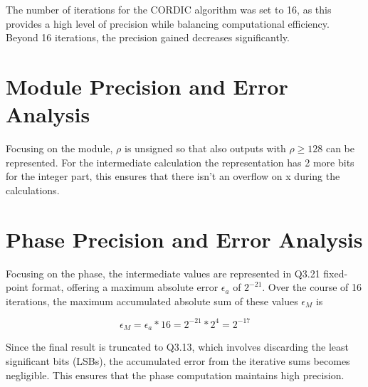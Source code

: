 The number of iterations for the CORDIC algorithm was set to 16, as this provides a high level of precision while balancing computational efficiency. Beyond 16 iterations, the precision gained decreases significantly.

\section{Module Precision and Error Analysis}
Focusing on the module, \( \rho \) is unsigned so that also outputs with \( \rho \geq 128 \) can be represented. For the intermediate calculation the representation has 2 more bits for the integer part, this ensures that there isn't an overflow on x during the calculations.


\section{Phase Precision and Error Analysis}
Focusing on the phase, the intermediate values are represented in Q3.21 fixed-point format, offering a maximum absolute error \( \epsilon_a \) of \(2^{-21}\). Over the course of 16 iterations, the maximum accumulated absolute sum of these values \( \epsilon_M \) is

\[
    \epsilon_M = \epsilon_a * 16 = 2^{-21} * 2^{4} = 2^{-17}
\]

Since the final result is truncated to Q3.13, which involves discarding the least significant bits (LSBs), the accumulated error from the iterative sums becomes negligible. This ensures that the phase computation maintains high precision.